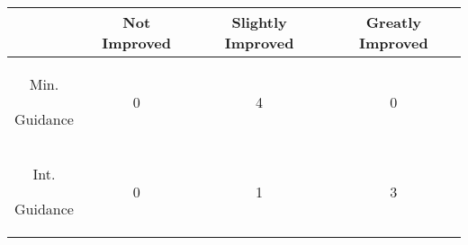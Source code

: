             \begin{table}







            \begin{center}







                \begin{tabular}{|c|c|c|c|}







                    \hline







                        & Not Improved & Slightly Improved & Greatly Improved \\







                    \hline







                    Min. %







Guidance & 0 & 4 & 0\\







                    \hline







                    Int. %







Guidance & 0 & 1 & 3\\







                    \hline








\end{tabular}
\end{center}
\end{table}
